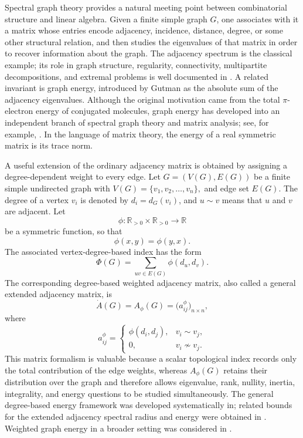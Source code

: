 \documentclass[12pt,twoside]{article}
\begin{document}
Spectral graph theory provides a natural meeting point between combinatorial structure and linear algebra. Given a finite simple graph $G$, one associates with it a matrix whose entries encode adjacency, incidence, distance, degree, or some other structural relation, and then studies the eigenvalues of that matrix in order to recover information about the graph. The adjacency spectrum is the classical example; its role in graph structure, regularity, connectivity, multipartite decompositions, and extremal problems is well documented in \cite{cds,ping,shi}. A related invariant is graph energy, introduced by Gutman \cite{gutmanenergy} as the absolute sum of the adjacency eigenvalues. Although the original motivation came from the total $\pi$-electron energy of conjugated molecules, graph energy has developed into an independent branch of spectral graph theory and matrix analysis; see, for example, \cite{shi,nv}. In the language of matrix theory, the energy of a real symmetric matrix is its trace norm.

A useful extension of the ordinary adjacency matrix is obtained by assigning a degree-dependent weight to every edge. Let
$
G=(V(G),E(G))
$
be a finite simple undirected graph with
$
V(G)=\{v_1,v_2,\ldots,v_n\},
$ and edge set $E(G).$
The degree of a vertex $v_i$ is denoted by $d_i=d_G(v_i)$, and $u\sim v$ means that $u$ and $v$ are adjacent. Let
$$
\phi:\mathbb R_{>0}\times\mathbb R_{>0}\longrightarrow\mathbb R
$$
be a symmetric function, so that
$$
\phi(x,y)=\phi(y,x).
$$
The associated vertex-degree-based index has the form
$$
\Phi(G)=\sum_{uv\in E(G)}\phi(d_u,d_v).
$$
The corresponding degree-based weighted adjacency matrix, also called a general extended adjacency matrix, is
$$
\dot A(G)=A_{\phi}(G)=\big(a_{ij}^{\phi}\big)_{n\times n},
$$
where
$$
a_{ij}^{\phi}=
\begin{cases}
	\phi(d_i,d_j),&v_i\sim v_j,\\
	0,&v_i\not\sim v_j.
\end{cases}
$$
This matrix formalism is valuable because a scalar topological index records only the total contribution of the edge weights, whereas $A_{\phi}(G)$ retains their distribution over the graph and therefore allows eigenvalue, rank, nullity, inertia, integrality, and energy questions to be studied simultaneously. The general degree-based energy framework was developed systematically in\cite{dasenergy}; related bounds for the extended adjacency spectral radius and energy were obtained in \cite{dgf,glza,gutman2022}. Weighted graph energy in a broader setting was considered in \cite{gs,HB}.
\end{document}
